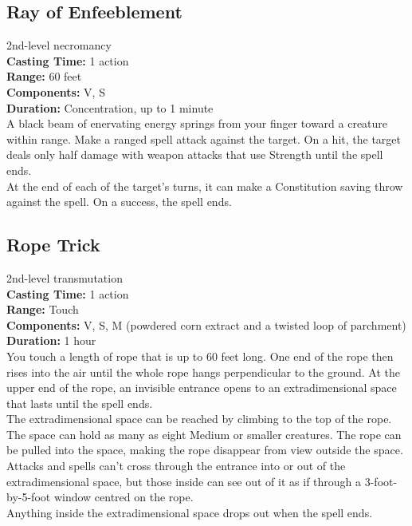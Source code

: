 \documentclass[11pt, A4paper, english]{article}
\begin{document}
		\subsection{Ray of Enfeeblement}
2nd-level necromancy \\
\textbf{Casting Time:} 1 action \\
\textbf{Range:} 60 feet \\
\textbf{Components:} V, S \\
\textbf{Duration:} Concentration, up to 1 minute \\
A black beam of enervating energy springs from your finger toward a creature within range. Make a ranged spell attack against the target. On a hit, the target deals only half damage with weapon attacks that use Strength until the spell ends. \\
At the end of each of the target’s turns, it can make a Constitution saving throw against the spell. On a success, the spell ends.

		\subsection{Rope Trick}
2nd-level transmutation \\
\textbf{Casting Time:} 1 action \\
\textbf{Range:} Touch \\
\textbf{Components:} V, S, M (powdered corn extract and a twisted loop of parchment) \\
\textbf{Duration:} 1 hour \\
You touch a length of rope that is up to 60 feet long. One end of the rope then rises into the air until the whole rope hangs perpendicular to the ground. At the upper end of the rope, an invisible entrance opens to an extradimensional space that lasts until the spell ends. \\
The extradimensional space can be reached by climbing to the top of the rope. The space can hold as many as eight Medium or smaller creatures. The rope can be pulled into the space, making the rope disappear from view outside the space. \\
Attacks and spells can’t cross through the entrance into or out of the extradimensional space, but those inside can see out of it as if through a 3-foot-by-5-foot window centred on the rope. \\
Anything inside the extradimensional space drops out when the spell ends.
\end{document}
